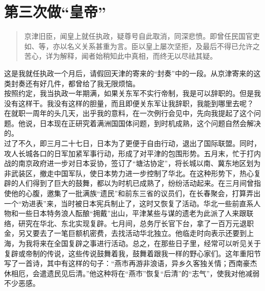 \fancyhead[RO]{\thepage} %
\fancyhead[LE]{\thepage} %
\chapter*{第三次做“皇帝”}
\begin{quote}
	京津旧臣，闻皇上就任执政，疑尊号自此取消，同深悲愤。即曾任民国官吏如、等，亦以名义关系甚重为言。臣以皇上屡次坚拒，及最后不得已允许之苦心，详为解释，闻者始稍知此中真相，而终无以尽祛其疑。\\
\end{quote}

这是我就任执政一个月后，请假回天津的寄来的“封奏”中的一段。从京津寄来的这类封奏还有好几件，都曾给了我无限烦恼。\\

按照约定，我当执政一年期满，如果关东军不实行帝制，我是可以辞职的。但是我没有这样干。我没有这样的胆量，而且即便关东军让我辞职，我能到哪里去呢？\\

在就职一周年的头几天，出乎我的意料，在一次例行会见中，先向我提起了这个问题。他说，日本现在正研究着满洲国国体问题，到时机成熟，这个问题自然会解决的。\\

过了不久，即三月二十七日，日本为了更便于自由行动，退出了国际联盟。同时，攻人长城各口的日军加紧军事行动，形成了对平津的包围形势。五月末，忙于打内战的南京政府进一步对日本妥协，签订了“塘沽协定”，将长城以南、冀东地区划为非武装区，撤走中国军队，使日本势力进一步控制了华北。在这种形势下，热心复辟的人们得到了巨大的鼓舞，都以为时机已成熟了，纷纷活动起来。在三月间曾指使他的心腹，邀集了一批满族“遗民”和前东三省的议员们，在长春聚会，打算弄出一个“劝进表”来，当时被日本宪兵制止了，这时又恢复了活动。华北一些前直系人物和一些日本特务浪人酝酿“拥戴”出山，平津某些与谋的遗老为此派了人来跟联络，研究在华北、东北实现复辟。七月间，总务厅长官下台，拿了一百万元退职金，另又要去了一笔巨额机密费，去找活动华北独立。他临走时向表示还要到上海，为我将来在全国复辟之事进行活动。总之，在那些日子里，经常可以听见关于复辟或帝制的传说，这些传说鼓舞着我，鼓舞着跟我一样的野心家们。这年重阳节写了一首诗，其中有这样的句子：“燕市再游非浪语，异乡久客独关情；西南豪杰休相厄，会遣遗民见后清。”他这种将在“燕市”恢复“后清”的“志气”，使我对他减弱不少恶感。\\

